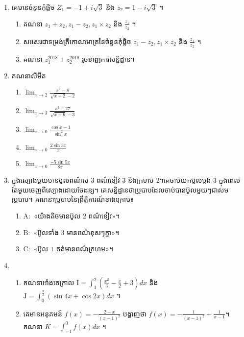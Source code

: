 \documentclass{officialexam}
\begin{document}
	\newpage
	{\maketitle}
	\borderline{\bigg[ប្រធានទី០២\bigg]}
	\begin{enumerate}[I]
		\item គេមានចំនួនកុំផ្លិច $Z_1=-1+i\sqrt{3}$ និង $z_2=1-i\sqrt{3}$ ។
		\begin{enumerate}[k]
			\item គណនា $z_1+z_2, z_1-z_2, z_1\times z_2$ និង $\frac{z_1}{z_2}$ ។
			\item សរសេរជាទម្រង់ត្រីកោណមាត្រនៃចំនួនកុំផ្លិច $z_1-z_2, z_1\times z_2$ និង $\frac{z_1}{z_2}$ ។
			\item គណនា $z_1^{2018}+z_2^{2018}$ រួចទាញការសន្និដ្ឋាន។
		\end{enumerate}
		\item គណនាលីមីត 
		\begin{enumerate}[k, 5]
			\item $\lim_{x\to2}\frac{x^3-8}{\sqrt{x+2}-2}$
			\item $\lim_{x\to3}\frac{x^3-27}{\sqrt{x+6}-3}$
			\item $\lim_{x\to0}\frac{\cos x-1}{\sin^2x}$
			\item $\lim_{x\to0}\frac{2\sin3x}{x}$
			\item $\lim_{x\to0}\frac{-5\sin5x}{8x}$
		\end{enumerate}
		\item ក្នុងស្បោងមួយមានប៊ូលពណ៌ស $3$ ពណ៌ខៀវ $3$ និងក្រហម $2$។គេចាប់យកប៊ូលម្ដង $3$ ក្នុងពេលតែមួយចេញពីស្បោងដោយចែដន្យ។ គេសន្និដ្ឋានថាប្រូបាបដែលចាប់បានប៊ូលមួយៗជាសមប្រូបាប។ គណនាប្រូបាបនៃព្រឹត្តិការណ៍ខាងក្រោម៖
		\begin{enumerate}[k]
			\item $\mathrm{A}:$ «យ៉ាងតិចមានប៊ូល $2$ ពណ៌ខៀវ»។
			\item $\mathrm{B}:$ «ប៊ូលទាំង $3$ មានពណ៌ខុសៗគ្នា»។
			\item $\mathrm{C}:$ «ប៊ូល $1$ គត់មានពណ៌ក្រហម»។
		\end{enumerate}
		\item \begin{enumerate}[k]
			\item គណនាអាំងតេក្រាល $\mathrm{I}=\int_{1}^{2}\left(\frac{x^2}{3}-\frac{x}{2}+3\right)dx$ និង $\mathrm{J}=\int_{0}^{\frac{\pi}{2}}\left(\sin4x+\cos2x\right)dx$ ។
			\item គេមានអនុគមន៍ $f(x)=-\frac{2-x}{\left(x-1\right)^2}$ បង្ហាញថា $f(x)=-\frac{1}{\left(x-1\right)^2}+\frac{1}{x-1}$។ គណនា $K=\int_{-1}^{0}f(x)dx$ ។

\end{enumerate}
\end{enumerate}
\end{document}

